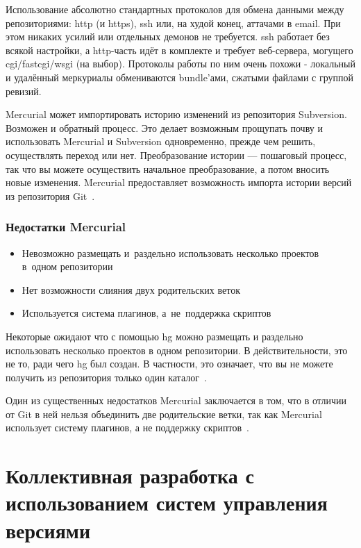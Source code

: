 \documentclass{../industrial-development}
\begin{document}
Использование абсолютно стандартных протоколов для обмена данными между репозиториями: http (и https), ssh или, на худой конец, аттачами в email.
При этом никаких усилий или отдельных демонов не требуется. ssh работает без всякой настройки, а http-часть идёт в комплекте и требует веб-сервера, могущего cgi/fastcgi/wsgi (на выбор). Протоколы работы по ним очень похожи - локальный и удалённый меркуриалы обмениваются bundle’ами, сжатыми файлами с группой ревизий.

Mercurial может импортировать историю изменений из репозитория Subversion. Возможен и обратный процесс. Это делает возможным прощупать почву и использовать Mercurial и Subversion одновременно, прежде чем решить, осуществлять переход или нет. Преобразование истории — пошаговый процесс, так что вы можете осуществить начальное преобразование, а потом вносить новые изменения.
Mercurial предоставляет возможность импорта истории версий из репозитория Git~\cite[с.~7--9]{MercurialOReilly}.

\begin{frame} \frametitle{Недостатки Mercurial}
  
  \begin{itemize}
  \item Невозможно размещать и~раздельно использовать несколько проектов в~одном репозитории
  \item Нет возможности слияния двух родительских веток
  \item Используется система плагинов, а~не~поддержка скриптов
  \end{itemize}
\end{frame}

\lecturenotes

Некоторые ожидают что с помощью hg можно размещать и раздельно использовать несколько проектов в одном репозитории. В действительности, это не то, ради чего hg был создан. В частности, это означает, что вы не можете получить из репозитория только один каталог~\cite{MercurialWiki}.

Один из существенных недостатков Mercurial заключается в том, что в отличии от Git в ней нельзя объединить две родительские ветки, так как Mercurial использует систему плагинов, а не поддержку скриптов~\cite{MercurialTD}.

\section{Коллективная разработка с использованием систем управления версиями}
\end{document}
